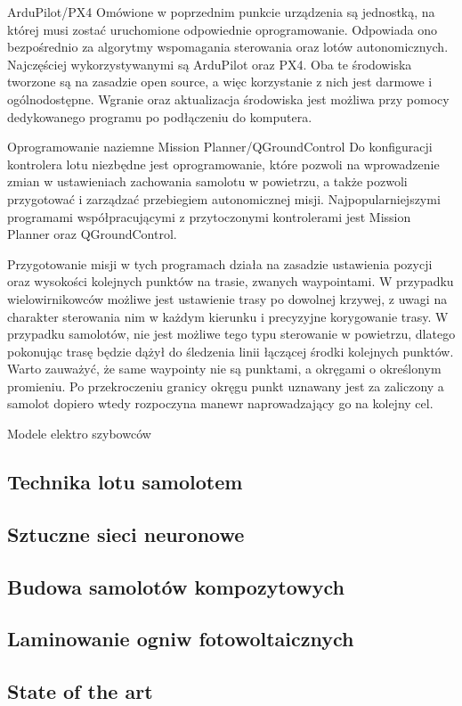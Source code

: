 \documentclass[12pt, a4paper]{article}
\begin{document}
ArduPilot/PX4
Omówione w poprzednim punkcie urządzenia są jednostką, na której musi zostać uruchomione odpowiednie oprogramowanie. Odpowiada ono bezpośrednio za algorytmy wspomagania sterowania oraz lotów autonomicznych. Najczęściej wykorzystywanymi są ArduPilot oraz PX4. Oba te środowiska tworzone są na zasadzie open source, a więc korzystanie z nich jest darmowe i ogólnodostępne. Wgranie oraz aktualizacja środowiska jest możliwa przy pomocy dedykowanego programu po podłączeniu do komputera.

Oprogramowanie naziemne
Mission Planner/QGroundControl
Do konfiguracji kontrolera lotu niezbędne jest oprogramowanie, które pozwoli na wprowadzenie zmian w ustawieniach zachowania samolotu w powietrzu, a także pozwoli przygotować i zarządzać przebiegiem autonomicznej misji. Najpopularniejszymi programami współpracującymi z przytoczonymi kontrolerami jest Mission Planner oraz QGroundControl.

Przygotowanie misji w tych programach działa na zasadzie ustawienia pozycji oraz wysokości kolejnych punktów na trasie, zwanych waypointami. W przypadku wielowirnikowców możliwe jest ustawienie trasy po dowolnej krzywej, z uwagi na charakter sterowania nim w każdym kierunku i precyzyjne korygowanie trasy. W przypadku samolotów, nie jest możliwe tego typu sterowanie w powietrzu, dlatego pokonując trasę będzie dążył do śledzenia linii łączącej środki kolejnych punktów. Warto zauważyć, że same waypointy nie są punktami, a okręgami o określonym promieniu. Po przekroczeniu granicy okręgu punkt uznawany jest za zaliczony a samolot dopiero wtedy rozpoczyna manewr naprowadzający go na kolejny cel.

Modele elektro szybowców

\subsection{Technika lotu samolotem}
\subsection{Sztuczne sieci neuronowe}
\subsection{Budowa samolotów kompozytowych}
\subsection{Laminowanie ogniw fotowoltaicznych}
\subsection{State of the art}
\newpage
\end{document}
